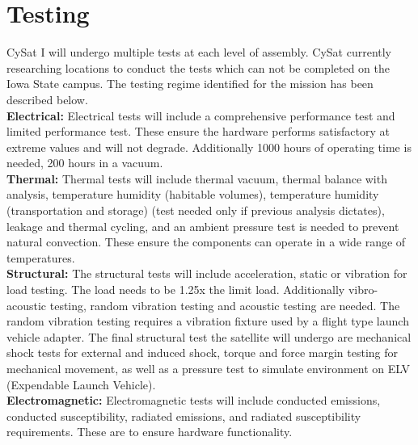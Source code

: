 \documentclass[nocover]            %
{CSLI}                       %
\begin{document}
\section{Testing}
CySat I will undergo multiple tests at each level of assembly. CySat currently researching locations to conduct the tests which can not be completed on the Iowa State campus. The testing regime identified for the mission has been described below.\\

\noindent\textbf{Electrical:} Electrical tests will include a comprehensive performance test and limited performance test.  These ensure the hardware performs satisfactory at extreme values and will not degrade.  Additionally 1000 hours of operating time is needed, 200 hours in a vacuum.\\  

\noindent\textbf{Thermal:} Thermal tests will include thermal vacuum, thermal balance with analysis, temperature humidity (habitable volumes), temperature humidity (transportation and storage) (test needed only if previous analysis dictates), leakage and thermal cycling, and an ambient pressure test is needed to prevent natural convection. These ensure the components can operate in a wide range of temperatures.\\ 

\noindent\textbf{Structural:} The structural tests will include acceleration, static or vibration for load testing. The load needs to be 1.25x the limit load.  Additionally vibro-acoustic testing, random vibration testing and acoustic testing  are needed.  The random vibration testing requires a vibration fixture used by a flight type launch vehicle adapter. The final structural test the satellite will undergo are mechanical shock tests for external and induced shock, torque and force margin testing for mechanical movement, as well as a pressure test to simulate environment on ELV (Expendable Launch Vehicle).\\

\noindent\textbf{Electromagnetic:} Electromagnetic tests will include conducted emissions, conducted susceptibility, radiated emissions, and radiated susceptibility requirements.  These are to ensure hardware functionality.\\
\end{document}
